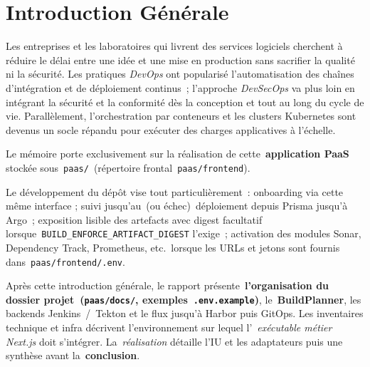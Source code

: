 \chapter*{Introduction Générale}
\label{ch:intro-generale}

Les entreprises et les laboratoires qui livrent des services logiciels cherchent à réduire le délai entre une idée et une mise en production sans sacrifier la qualité ni la sécurité. Les pratiques \emph{DevOps} ont popularisé l'automatisation des chaînes d'intégration et de déploiement continus~; l'approche \emph{DevSecOps} va plus loin en intégrant la sécurité et la conformité dès la conception et tout au long du cycle de vie. Parallèlement, l'orchestration par conteneurs et les clusters Kubernetes sont devenus un socle répandu pour exécuter des charges applicatives à l'échelle.

Le mémoire porte exclusivement sur la réalisation de cette~\textbf{application PaaS} stockée sous~\texttt{paas/}~(répertoire frontal~\texttt{paas/frontend}).

Le développement du dépôt vise tout particulièrement~: onboarding via cette même interface ; suivi jusqu'au~(ou échec)~déploiement depuis Prisma jusqu'à Argo~; exposition lisible des artefacts avec digest facultatif lorsque~\texttt{BUILD\_ENFORCE\_ARTIFACT\_DIGEST} l'exige~; activation des modules Sonar, Dependency Track, Prometheus, etc.\ lorsque les URLs et jetons sont fournis dans~\texttt{paas/frontend/.env}.

Après cette introduction générale, le rapport présente~\textbf{l'organisation du dossier projet~(\texttt{paas/docs/}, exemples~\texttt{.env.example})}, le~\textbf{BuildPlanner}, les backends Jenkins~/~Tekton et le flux jusqu'à Harbor puis GitOps. Les inventaires technique et infra décrivent l'environnement sur lequel l'~\emph{exécutable métier Next.js} doit s'intégrer. La~\emph{réalisation} détaille l'IU et les adaptateurs puis une synthèse avant la~\textbf{conclusion}.

